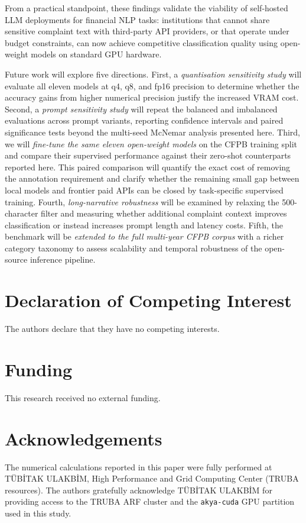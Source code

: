 \documentclass[a4paper,fleqn]{cas-dc}
\begin{document}
From a practical standpoint, these findings validate the viability
of self-hosted LLM deployments for financial NLP tasks: institutions
that cannot share sensitive complaint text with third-party API
providers, or that operate under budget constraints, can now achieve
competitive classification quality using open-weight models on
standard GPU hardware.

Future work will explore five directions.
First, a \emph{quantisation sensitivity study} will evaluate all eleven
models at q4, q8, and fp16 precision to determine whether the accuracy
gains from higher numerical precision justify the increased VRAM cost.
Second, a \emph{prompt sensitivity study} will repeat the
balanced and imbalanced evaluations across prompt variants,
reporting confidence intervals and paired significance tests
beyond the multi-seed McNemar analysis presented here.
Third, we will \emph{fine-tune the same eleven open-weight models} on
the CFPB training split and compare their supervised performance against
their zero-shot counterparts reported here. This paired comparison will
quantify the exact cost of removing the annotation requirement and
clarify whether the remaining small gap between local models and
frontier paid APIs can be closed by task-specific supervised training.
Fourth, \emph{long-narrative robustness} will be examined by relaxing
the 500-character filter and measuring whether additional complaint
context improves classification or instead increases prompt length and
latency costs.
Fifth, the benchmark will be \emph{extended to the full multi-year
CFPB corpus} with a richer category taxonomy to assess scalability
and temporal robustness of the open-source inference pipeline.


\section*{Declaration of Competing Interest}
The authors declare that they have no competing interests.

\section*{Funding}
This research received no external funding.

\section*{Acknowledgements}
The numerical calculations reported in this paper were fully performed
at T{\"U}B\.{I}TAK ULAKB\.{I}M, High Performance and Grid Computing
Center (TRUBA resources). The authors gratefully acknowledge
T{\"U}B\.{I}TAK ULAKB\.{I}M for providing access to the TRUBA ARF
cluster and the \texttt{akya-cuda} GPU partition used in this study.
\end{document}
